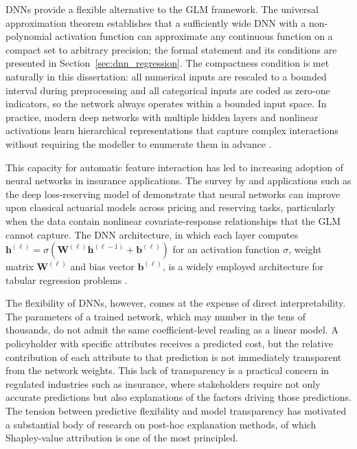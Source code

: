 DNNs provide a flexible alternative to the GLM framework.
The universal approximation theorem
\citep{hornik1989multilayer, cybenko1989approximation} establishes that a
sufficiently wide DNN with a non-polynomial activation
function can approximate any continuous function on a compact set to
arbitrary precision; the formal statement and its conditions are
presented in Section~\ref{sec:dnn_regression}.  The compactness
condition is met naturally in this dissertation: all numerical inputs
are rescaled to a bounded interval during preprocessing and all
categorical inputs are coded as zero-one indicators, so the network
always operates within a bounded input space.  In
practice, modern deep networks with multiple hidden layers and nonlinear
activations learn hierarchical representations that capture complex
interactions without requiring the modeller to enumerate them in advance
\citep{goodfellow2016deep}.

This capacity for automatic feature interaction has led to increasing
adoption of neural networks in insurance applications.  The survey by
\citet{richman2021ai} and applications such as the deep loss-reserving
model of \citet{kuo2019deep} demonstrate that neural networks can
improve upon classical actuarial models across pricing and reserving
tasks, particularly when the data contain nonlinear covariate-response
relationships that the GLM cannot capture.  The DNN architecture, in which each layer
computes $\mathbf{h}^{(\ell)} = \sigma(\mathbf{W}^{(\ell)}
\mathbf{h}^{(\ell-1)} + \mathbf{b}^{(\ell)})$ for an activation function
$\sigma$, weight matrix $\mathbf{W}^{(\ell)}$ and bias vector
$\mathbf{b}^{(\ell)}$, is a widely employed architecture for
tabular regression problems \citep{goodfellow2016deep, richman2021ai}.

The flexibility of DNNs, however, comes at the expense of
direct interpretability.  The parameters of a trained network, which may
number in the tens of thousands, do not admit the same coefficient-level
reading as a linear model.  A policyholder with specific attributes
receives a predicted cost, but the relative contribution of each
attribute to that prediction is not immediately transparent from the
network weights.  This lack of transparency is a practical concern in
regulated industries such as insurance, where stakeholders require not
only accurate predictions but also explanations of the factors driving
those predictions.  The tension between predictive flexibility and model
transparency has motivated a substantial body of research on post-hoc
explanation methods, of which Shapley-value attribution is one of the
most principled.

